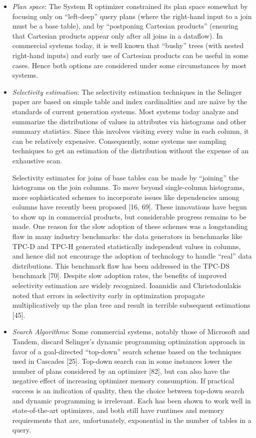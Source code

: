 \documentclass[a4paper,11pt,twoside,openright]{book}
\begin{document}
\begin{itemize}
\item
  \emph{Plan space}: The System R optimizer constrained its plan space
  somewhat by focusing only on ``left-deep'' query plans (where the
  right-hand input to a join must be a base table), and by ``postponing
  Cartesian products'' (ensuring that Cartesian products appear only
  after all joins in a dataflow). In commercial systems today, it is
  well known that ``bushy'' trees (with nested right-hand inputs) and
  early use of Cartesian products can be useful in some cases. Hence
  both options are considered under some circumstances by most systems.
\item
  \emph{Selectivity estimation}: The selectivity estimation techniques
  in the Selinger paper are based on simple table and index
  cardinalities and are na{\"\i}ve by the standards of current generation
  systems. Most systems today analyze and summarize the distributions of
  values in attributes via histograms and other summary statistics.
  Since this involves visiting every value in each column, it can be
  relatively expensive. Consequently, some systems use sampling
  techniques to get an estimation of the distribution without the
  expense of an exhaustive scan.

Selectivity estimates for joins of base tables can be made by
``joining'' the histograms on the join columns. To move beyond
single-column histograms, more sophisticated schemes to incorporate
issues like dependencies among columns have recently been proposed
{[}16, 69{]}. These innovations have begun to show up in commercial
products, but considerable progress remains to be made. One reason for
the slow adoption of these schemes was a longstanding flaw in many
industry benchmarks: the data generators in benchmarks like TPC-D and
TPC-H generated statistically independent values in columns, and hence
did not encourage the adoption of technology to handle ``real'' data
distributions. This benchmark flaw has been addressed in the TPC-DS
benchmark {[}70{]}. Despite slow adoption rates, the benefits of
improved selectivity estimation are widely recognized. Ioannidis and
Christodoulakis noted that errors in selectivity early in optimization
propagate multiplicatively up the plan tree and result in terrible
subsequent estimations {[}45{]}.

\item
  \emph{Search Algorithms}: Some commercial systems, notably those of
  Microsoft and Tandem, discard Selinger's dynamic programming
  optimization approach in favor of a goal-directed ``top-down'' search
  scheme based on the techniques used in Cascades {[}25{]}. Top-down
  search can in some instances lower the number of plans considered by
  an optimizer {[}82{]}, but can also have the negative effect of
  increasing optimizer memory consumption. If practical success is an
  indication of quality, then the choice between top-down search and
  dynamic programming is irrelevant. Each has been shown to work well in
  state-of-the-art optimizers, and both still have runtimes and memory
  requirements that are, unfortunately, exponential in the number of
  tables in a query.


\end{itemize}
\end{document}

